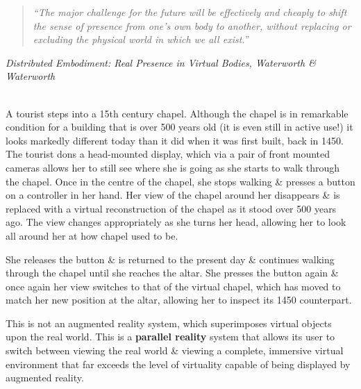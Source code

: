 \begin{quote}
	\textit{``The major challenge for the future will be effectively and cheaply to shift the sense of presence from one's own body to another, without replacing or excluding the physical world in which we all exist.''}
\end{quote}
\hfill \textit{Distributed Embodiment: Real Presence in Virtual Bodies, Waterworth \& Waterworth}
\\
\\

\label{introduction}


A tourist steps into a 15th century chapel. Although the chapel is in remarkable condition for a building that is over 500 years old (it is even still in active use!) it looks markedly different today than it did when it was first built, back in 1450. The tourist dons a head-mounted display, which via a pair of front mounted cameras allows her to still see where she is going as she starts to walk through the chapel. Once in the centre of the chapel, she stops walking \& presses a button on a controller in her hand. Her view of the chapel around her disappears \& is replaced with a virtual reconstruction of the chapel as it stood over 500 years ago. The view changes appropriately as she turns her head, allowing her to look all around her at how chapel used to be.

She releases the button \& is returned to the present day \& continues walking through the chapel until she reaches the altar. She presses the button again \& once again her view switches to that of the virtual chapel, which has moved to match her new position at the altar, allowing her to inspect its 1450 counterpart.

This is not an augmented reality system, which superimposes virtual objects upon the real world. This is a \textbf{parallel reality} system that allows its user to switch between viewing the real world \& viewing a complete, immersive virtual environment that far exceeds the level of virtuality capable of being displayed by augmented reality.


